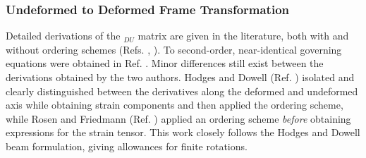 \subsubsection{Undeformed to Deformed Frame Transformation}
Detailed derivations of the \tee$_{DU}$ matrix are given in the literature, both with and without ordering schemes (Refs. \cite{HodgesDowell1}, \cite{Ormiston1}). To second-order, near-identical governing equations were obtained in Ref. \cite{Rosen1}. Minor differences still exist between the derivations obtained by the two authors. Hodges and Dowell (Ref. \cite{HodgesDowell1}) isolated and clearly distinguished between the derivatives along the deformed and undeformed axis while obtaining strain components and then applied the ordering scheme, while Rosen and Friedmann (Ref. \cite{Rosen1}) applied an ordering scheme \emph{before} obtaining expressions for the strain tensor. This work closely follows the Hodges and Dowell beam formulation, giving allowances for finite rotations. 

